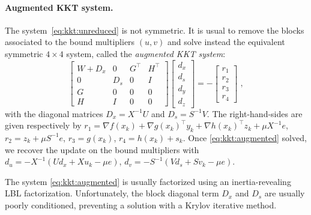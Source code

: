 \paragraph{Augmented KKT system.}
The system~\eqref{eq:kkt:unreduced} is not symmetric.
It is usual to remove the blocks associated
to the bound multipliers $(u, v)$ and solve instead the equivalent
symmetric $4 \times 4$ system, called the \emph{augmented KKT system}:
\begin{equation}
  \label{eq:kkt:augmented}
  \tag{$K_2$}
  \begin{bmatrix}
    W + D_x & 0 & G^\top & H^\top \\
    0 & D_s & 0& I \\
    G & 0 & 0 & 0 \\
    H & I & 0 & 0
  \end{bmatrix}
  \begin{bmatrix}
    d_x \\
    d_s \\
    d_y \\
    d_z
  \end{bmatrix}
  = - \begin{bmatrix}
    r_1 \\ r_2 \\ r_3 \\ r_4
  \end{bmatrix} \; ,
\end{equation}
with the diagonal matrices $D_x = X^{-1} U$ and $D_s = S^{-1} V$.
The right-hand-sides are given respectively by
$r_1 = \nabla f(x_k) + \nabla g(x_k)^\top y_k + \nabla h(x_k)^\top z_k + \mu X^{-1} e$,
$r_2 = z_k + \mu S^{-1} e$,
$r_3 = g(x_k)$,
$r_4 = h(x_k) + s_k$.
Once \eqref{eq:kkt:augmented} solved, we recover the
update on the bound multipliers with
$d_u = - X^{-1}(U d_x + X u_k - \mu e)$,
$d_v = - S^{-1}(V d_s + S v_k - \mu e)$.

The system \eqref{eq:kkt:augmented} is usually factorized using
an inertia-revealing LBL factorization.
Unfortunately, the block diagonal term
$D_x$ and $D_s$ are usually poorly conditioned, preventing
a solution with a Krylov iterative method.

